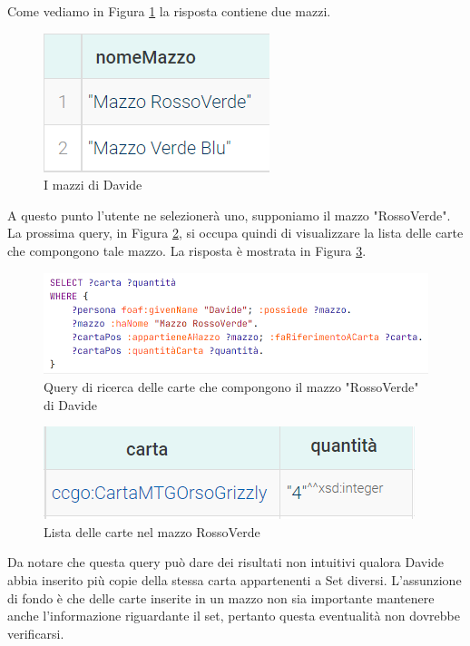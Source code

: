 \documentclass[12pt]{article}
\begin{document}
Come vediamo in Figura \ref{fig:res1_davide} la risposta  contiene due mazzi.

\begin{figure}[H]
    \centering
    \includegraphics[]{files/res1_davide.png}
    \caption{I mazzi di Davide}
    \label{fig:res1_davide}
\end{figure}

A questo punto l'utente ne selezionerà uno, supponiamo il mazzo "RossoVerde". La prossima query, in  Figura \ref{fig:query2_davide}, si occupa quindi di visualizzare la lista delle carte che compongono tale mazzo. La risposta è mostrata in Figura \ref{fig:res2_davide}.

\begin{figure}[H]
    \centering
    \includegraphics[width=14cm]{files/query2_davide.png}
    \caption{Query di ricerca delle carte che compongono il mazzo "RossoVerde" di Davide}
    \label{fig:query2_davide}
\end{figure}

\begin{figure}[H]
    \centering
    \includegraphics[]{files/res2_davide.png}
    \caption{Lista delle carte nel mazzo RossoVerde}
    \label{fig:res2_davide}
\end{figure}

Da notare che questa query può dare dei risultati non intuitivi qualora Davide abbia inserito più copie della stessa carta appartenenti a Set diversi. L'assunzione di fondo è che delle carte inserite in un mazzo non sia importante mantenere anche l'informazione riguardante il set, pertanto questa eventualità non dovrebbe verificarsi.
\end{document}
